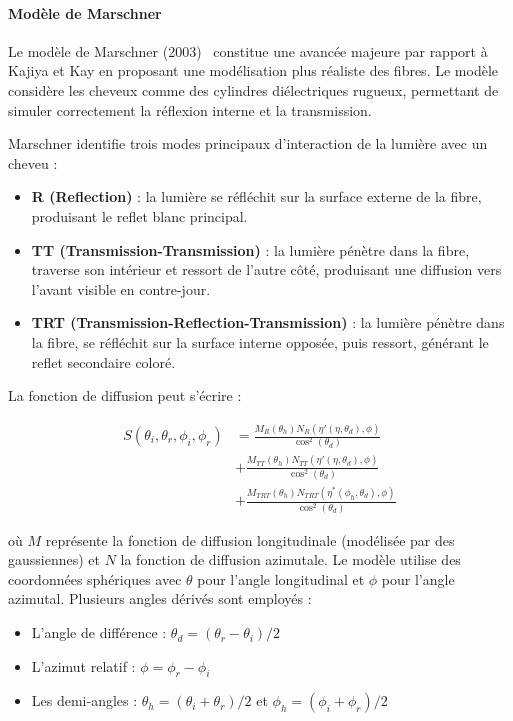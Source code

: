 \paragraph{Modèle de Marschner}

Le modèle de Marschner (2003)~\cite{marschner2003} constitue une avancée majeure par rapport à Kajiya et Kay en proposant une modélisation plus réaliste des fibres. Le modèle considère les cheveux comme des cylindres diélectriques rugueux, permettant de simuler correctement la réflexion interne et la transmission.

Marschner identifie trois modes principaux d'interaction de la lumière avec un cheveu :

\begin{itemize}[noitemsep]
    \item \textbf{R (Reflection)} : la lumière se réfléchit sur la surface externe de la fibre, produisant le reflet blanc principal.
    \item \textbf{TT (Transmission-Transmission)} : la lumière pénètre dans la fibre, traverse son intérieur et ressort de l'autre côté, produisant une diffusion vers l'avant visible en contre-jour.
    \item \textbf{TRT (Transmission-Reflection-Transmission)} : la lumière pénètre dans la fibre, se réfléchit sur la surface interne opposée, puis ressort, générant le reflet secondaire coloré.
\end{itemize}

La fonction de diffusion peut s'écrire :

\begin{equation}
\begin{aligned}
S(\theta_i, \theta_r, \phi_i, \phi_r) &= \frac{M_R(\theta_h) N_R(\eta'(\eta, \theta_d), \phi)}{\cos^2(\theta_d)} \\
&+ \frac{M_{TT}(\theta_h) N_{TT}(\eta'(\eta, \theta_d), \phi)}{\cos^2(\theta_d)} \\
&+ \frac{M_{TRT}(\theta_h) N_{TRT}(\eta^*(\phi_h, \theta_d), \phi)}{\cos^2(\theta_d)}
\end{aligned}
\end{equation}

où $M$ représente la fonction de diffusion longitudinale (modélisée par des gaussiennes) et $N$ la fonction de diffusion azimutale. Le modèle utilise des coordonnées sphériques avec $\theta$ pour l'angle longitudinal et $\phi$ pour l'angle azimutal. Plusieurs angles dérivés sont employés :
\begin{itemize}
    \item L'angle de diff\'erence : $\theta_d = (\theta_r - \theta_i)/2$
    \item L'azimut relatif : $\phi = \phi_r - \phi_i$
    \item Les demi-angles : $\theta_h = (\theta_i + \theta_r)/2$ et $\phi_h = (\phi_i + \phi_r)/2$
\end{itemize}

